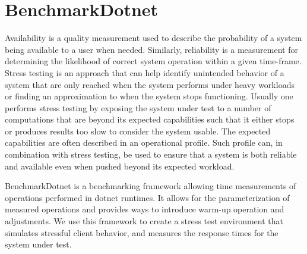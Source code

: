 \section*{BenchmarkDotnet}
Availability is a quality measurement used to describe the probability of a system being available to a user when needed. Similarly, reliability is a measurement for determining the likelihood of correct system operation within a given time-frame. \cite{reliabilityAvailability}
Stress testing is an approach that can help identify unintended behavior of a system that are only reached when the system performs under heavy workloads or finding an approximation to when the system stops functioning.
Usually one performs stress testing by exposing the system under test to a number of computations that are beyond its expected capabilities such that it either stops or produces results too slow to consider the system usable\cite{Sommerville10}. 
The expected capabilities are often described in an operational profile\cite{OperationalProfiles}. 
Such profile can, in combination with stress testing, be used to ensure that a system is both reliable and available even when pushed beyond its expected workload.

BenchmarkDotnet\cite{Benchmarkdotnet} is a benchmarking framework allowing time measurements of operations performed in dotnet runtimes. 
It allows for the parameterization of measured operations and provides ways to introduce warm-up operation and adjustments. 
We use this framework to create a stress test environment that simulates stressful client behavior, and measures the response times for the system under test. 

